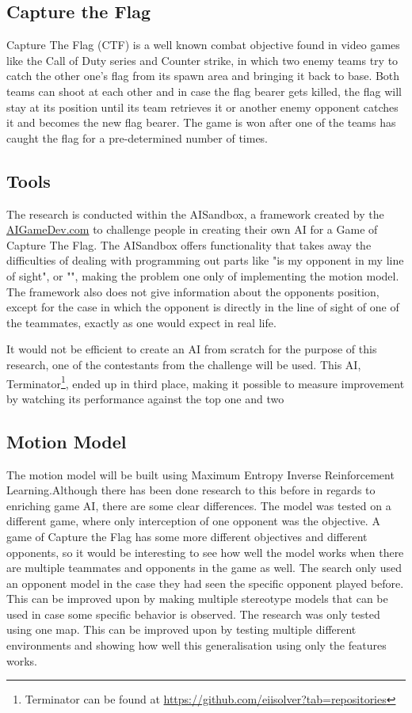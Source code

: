 \documentclass[a4paper, 12pt]{article}
\begin{document}
\subsection{Capture the Flag}
Capture The Flag (CTF) is a well known combat objective found in video games
like the Call of Duty series and Counter strike, in which two enemy teams try to
catch the other one's flag from its spawn area and bringing it back to base.
Both teams can shoot at each other and in case the flag bearer gets killed, the
flag will stay at its position until its team retrieves it or another enemy
opponent catches it and becomes the new flag bearer. The game is won after one
of the teams has caught the flag for a pre-determined number of times.


\subsection{Tools}
The research is conducted within the AISandbox, a framework created by the
\url{AIGameDev.com} to challenge people in creating their own AI for a Game of
Capture The Flag. The AISandbox offers functionality that takes away the
difficulties of dealing with programming out parts like "is my opponent in my
line of sight", or "", making the
problem one only of implementing the motion model. The framework also does not
give information about the opponents position, except for the case in which the
opponent is directly in the line of sight of one of the teammates, exactly as
one would expect in real life.

It would not be efficient to create an AI from scratch for the purpose of
this research, one of the contestants from the challenge will be
used. This AI, Terminator\footnote{Terminator can be found at \url{https://github.com/eiisolver?tab=repositories}}, ended up in third place, making it possible to
measure improvement by watching its performance against the top one and two

\subsection{Motion Model}
The motion model will be built using Maximum Entropy Inverse Reinforcement
Learning.Although there has been done research to this before \citep{6374144}
in regards to enriching game AI, there are some clear differences. 
The model was tested on a different game, where only interception of one
opponent was the objective. A game of Capture the Flag has some more different
objectives and different opponents, so it would be interesting to see how well
the model works when there are multiple teammates and opponents in the game as
well.
The search only used an opponent model in the case they had seen the specific
opponent played before. This can be improved upon by making multiple stereotype
models that can be used in case some specific behavior is observed. 
The research was only tested using one map. This can be improved upon by testing
multiple different environments and showing how well this generalisation using
only the features works.
\end{document}
